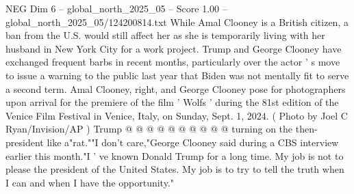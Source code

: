 \begin{textsample}{NEG Dim 6 – global\_north\_2025\_05 – Score 1.00 – global\_north\_2025\_05/124200814.txt}
While Amal Clooney is a British citizen, a ban from the U.S. would still affect her as she is temporarily living with her husband in New York City for a work project.
Trump and George Clooney have exchanged frequent barbs in recent months, particularly over the actor ' s move to issue a warning to the public last year that Biden was not mentally fit to serve a second term.
Amal Clooney, right, and George Clooney pose for photographers upon arrival for the premiere of the film ' Wolfs ' during the 81st edition of the Venice Film Festival in Venice, Italy, on Sunday, Sept. 1, 2024. ( Photo by Joel C Ryan/Invision/AP ) Trump @ @ @ @ @ @ @ @ @ @ turning on the then-president like a"rat.""I don't care,"George Clooney said during a CBS interview earlier this month."I ' ve known Donald Trump for a long time.
My job is not to please the president of the United States.
My job is to try to tell the truth when I can and when I have the opportunity."

\end{textsample}
